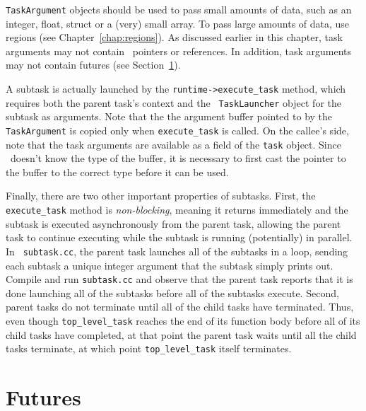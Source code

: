 {\tt TaskArgument} objects should be used to pass small amounts of data,
such as an integer, float, struct or a (very) small array.  To pass large amounts of
data, use regions (see Chapter~\ref{chap:regions}).  As
discussed earlier in this chapter, task arguments may not contain
\Cpp\ pointers or references.  In addition, task arguments may not contain
futures (see Section~\ref{sec:futures}).

A subtask is actually launched by the {\tt runtime->execute\_task}
method, which requires both the parent task's context and the {\tt
  TaskLauncher} object for the subtask as arguments.  Note that the
the argument buffer pointed to by the {\tt TaskArgument} is copied
only when {\tt execute\_task} is called. On the callee's side, note
that the task arguments are available as a field of the {\tt task}
object. Since \Cpp\ doesn't know the type of the buffer, it is
necessary to first cast the pointer to the buffer to the correct type
before it can be used.

Finally, there are two other important properties of subtasks.  First,
the {\tt execute\_task} method is {\em non-blocking}, meaning it
returns immediately and the subtask is executed asynchronously from
the parent task, allowing the parent task to continue executing while
the subtask is running (potentially) in parallel.  In {\tt
  subtask.cc}, the parent task launches all of the subtasks in a loop,
sending each subtask a unique integer argument that the subtask simply prints
out.  Compile and run {\tt subtask.cc} and observe that the
parent task reports that it is done launching all of the subtasks
before all of the subtasks execute.  Second, parent tasks do not
terminate until all of the child tasks have terminated.  Thus, even
though {\tt top\_level\_task} reaches the end of its function body
before all of its child tasks have completed, at that point the parent
task waits until all the child tasks terminate, at which point
{\tt top\_level\_task} itself terminates.

\section{Futures}
\label{sec:futures}

